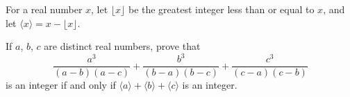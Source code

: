 \documentclass[varwidth]{standalone}
\begin{document}
    For a real number $x$, let $\lfloor x \rfloor$ be the greatest integer less than or equal to $x$, and let $\langle x \rangle = x - \lfloor x \rfloor$.

    If $a$, $b$, $c$ are distinct real numbers, prove that
    \[
        \frac{a^3}{(a - b)(a - c)} + \frac{b^3}{(b - a)(b - c)} + \frac{c^3}{(c - a)(c - b)}  
    \]
    is an integer if and only if $\langle a \rangle + \langle b \rangle + \langle c \rangle$ is an integer.
\end{document}
